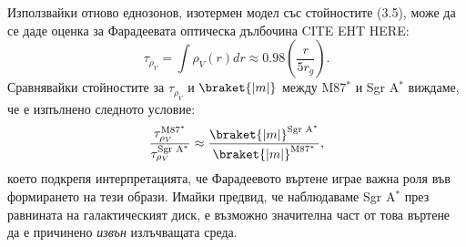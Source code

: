 \begin{minipage}{18em}
	Използвайки отново еднозонов, изотермен модел със стойностите (3.5), може да се даде оценка за Фарадеевата оптическа дълбочина CITE EHT HERE:
	\begin{equation}
		\tau_{\rho_V} = \int \rho_{V}(r)dr\approx 0.98\left(\frac{r}{5r_g}\right).
	\end{equation}
	Сравнявайки стойностите за $\tau_{\rho_V}$ и $\braket{|m|}$ между M87$^*$ и Sgr A$^*$ виждаме, че е изпълнено следното условие:
	\begin{equation}
		\frac{\tau_{\rho_V}^{\text{M87}^*}}{\tau_{\rho_V}^{\text{Sgr A}^*}}\approx\frac{\braket{|m|}^{\text{Sgr A}^*}}{\braket{|m|}^{\text{M87}^*}},
	\end{equation}
	което подкрепя интерпретацията, че Фарадеевото въртене играе важна роля във формирането на тези образи. Имайки предвид, че наблюдаваме Sgr A$^*$ през равнината на галактическият диск, е възможно значителна част от това въртене да е причинено \emph{извън} излъчващата среда.
\end{minipage}$\,\,\,$
